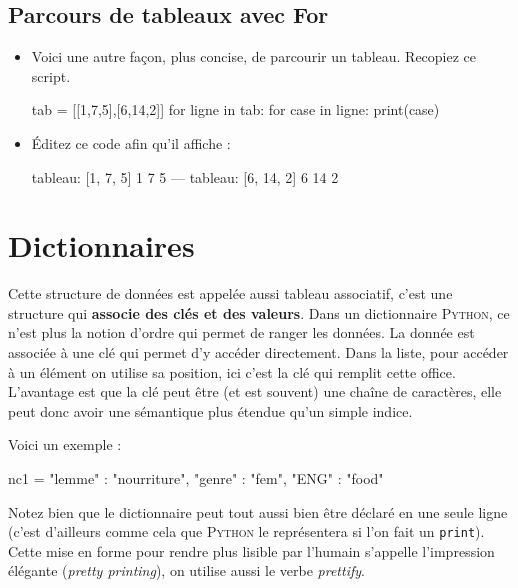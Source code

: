 \subsection{Parcours de tableaux avec For}

\begin{itemize}
\item Voici une autre façon, plus concise, de parcourir un tableau. Recopiez ce script.
\begin{python}
tab = [[1,7,5],[6,14,2]]
  for ligne in tab:
    for case in ligne:
      print(case)
\end{python}

\item Éditez ce code afin qu'il affiche :

\begin{python}
tableau: [1, 7, 5]
1
7
5
---
tableau: [6, 14, 2]
6
14
2
\end{python}
\end{itemize}

\section{Dictionnaires}

 Cette structure de données est appelée aussi tableau associatif, c'est une structure qui \textbf{associe des clés et des valeurs}.
 Dans un dictionnaire \textsc{Python}, ce n'est plus la notion d'ordre qui permet de ranger les données. La donnée est associée à une clé qui permet d'y accéder directement.
 Dans la liste, pour accéder à un élément on utilise sa position, ici c'est la clé qui remplit cette office. L'avantage est que la clé peut être (et est souvent) une chaîne de caractères, elle peut donc avoir une sémantique plus étendue qu'un simple indice.

Voici un exemple :
\begin{python}
nc1 = { "lemme" : "nourriture",
	"genre" : "fem",
	"ENG"   : "food"
      }
\end{python}

Notez bien que le dictionnaire peut tout aussi bien être déclaré en une seule ligne (c'est d'ailleurs comme cela que \textsc{Python} le représentera si l'on fait un \texttt{print}). Cette mise en forme pour rendre plus lisible par l'humain s'appelle l'impression élégante (\textit{pretty printing}), on utilise aussi le verbe \textit{prettify}.

\exer

